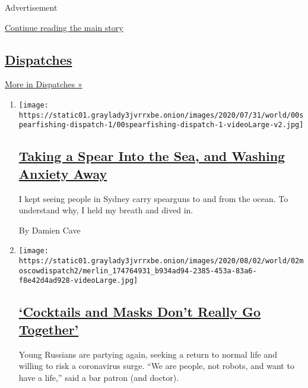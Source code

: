 Advertisement

\protect\hyperlink{after-mid2}{Continue reading the main story}

\hypertarget{dispatches}{%
\subsection{\texorpdfstring{\href{/spotlight/dispatches-international}{Dispatches}}{Dispatches}}\label{dispatches}}

\href{/spotlight/dispatches-international}{More in Dispatches »}

\begin{enumerate}
\def\labelenumi{\arabic{enumi}.}
\item
  \texttt{[image: https://static01.graylady3jvrrxbe.onion/images/2020/07/31/world/00spearfishing-dispatch-1/00spearfishing-dispatch-1-videoLarge-v2.jpg]}

  \hypertarget{taking-a-spear-into-the-sea-and-washing-anxiety-away}{%
  \subsection{\texorpdfstring{\href{/2020/08/03/world/australia/spearfishing-sydney-coronavirus.html}{Taking
  a Spear Into the Sea, and Washing Anxiety
  Away}}{Taking a Spear Into the Sea, and Washing Anxiety Away}}\label{taking-a-spear-into-the-sea-and-washing-anxiety-away}}

  I kept seeing people in Sydney carry spearguns to and from the ocean.
  To understand why, I held my breath and dived in.

  By Damien Cave
\item
  \texttt{[image: https://static01.graylady3jvrrxbe.onion/images/2020/08/02/world/02moscowdispatch2/merlin\_174764931\_b934ad94-2385-453a-83a6-f8e42d4ad928-videoLarge.jpg]}

  \hypertarget{cocktails-and-masks-dont-really-go-together}{%
  \subsection{\texorpdfstring{\href{/2020/08/01/world/europe/russia-moscow-coronavirus.html}{`Cocktails
  and Masks Don't Really Go
  Together'}}{`Cocktails and Masks Don't Really Go Together'}}\label{cocktails-and-masks-dont-really-go-together}}

  Young Russians are partying again, seeking a return to normal life and
  willing to risk a coronavirus surge. ``We are people, not robots, and
  want to have a life,'' said a bar patron (and doctor).


\end{enumerate}
